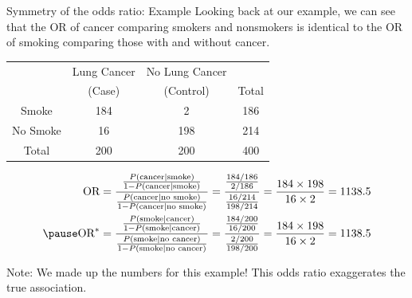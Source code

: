 \documentclass[10pt,t]{beamer}
\begin{document}
\begin{frame}{Symmetry of the odds ratio: Example}
	\vspace{-0.8cm}
	Looking back at our example, we can see that the OR of cancer comparing smokers and nonsmokers is identical to the OR of smoking comparing those with and without cancer. 
	\begin{center}
		\begin{table}
			\begin{tabular}{|c|cc|c|}
				\hline 
				& Lung Cancer & No Lung Cancer &  \\ 
				& (Case) & (Control) & Total  \\
				\hline 
				Smoke & 184 & 2  & 186 \\ 
				No Smoke & 16 & 198 & 214  \\ 
				\hline 
				Total & 200 & 200 & 400 \\ 
				\hline 
			\end{tabular}
		\end{table}\pause
	\end{center}
	\begin{align*}
		\text{OR} = \frac{\frac{P(\text{cancer} \mid \text{smoke})}{1 - P(\text{cancer} \mid \text{smoke})}}{\frac{P(\text{cancer} \mid \text{no smoke})}{1 - P(\text{cancer} \mid \text{no smoke})}}  = \frac{\frac{184/186}{2/186}}{\frac{16/214}{198/214}} = \frac{184\times 198}{16 \times 2} = 1138.5\\ \pause
		\text{OR}^* =\frac{\frac{P(\text{smoke} \mid \text{cancer})}{1 - P(\text{smoke} \mid \text{cancer})}}{\frac{P(\text{smoke} \mid \text{no cancer})}{1 - P(\text{smoke} \mid \text{no cancer})}}  = \frac{\frac{184/200}{16/200}}{\frac{2/200}{198/200}} = \frac{184\times 198}{16 \times 2} = 1138.5
	\end{align*}
\vfill
\begin{tiny}Note: We made up the numbers for this example! This odds ratio exaggerates the true association.\end{tiny}
\end{frame}
\end{document}
